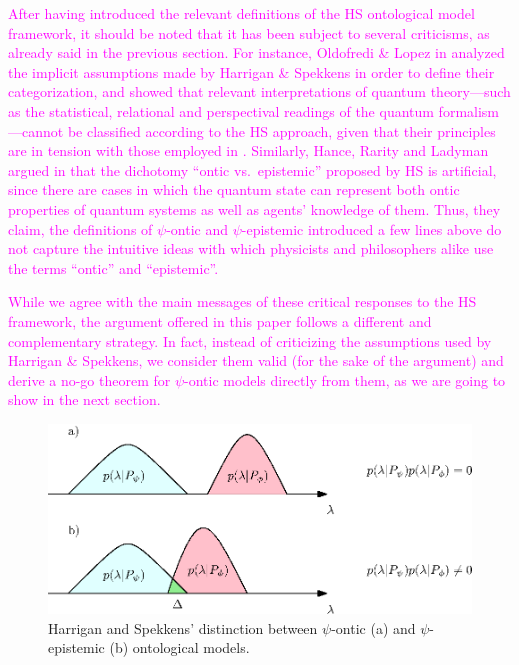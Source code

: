 \documentclass[10pt,twocolumn, nofootinbib]{revtex4-2}
\begin{document}
\textcolor{magenta}{After having introduced the relevant definitions of the HS ontological model framework, it should be noted that it has been subject to several criticisms, as already said in the previous section. For instance, Oldofredi \& Lopez in \cite{Oldofredi:2020b} analyzed the implicit assumptions made by Harrigan \& Spekkens in order to define their categorization, and showed that relevant interpretations of quantum theory---such as the statistical, relational and perspectival readings of the quantum formalism---cannot be classified according to the HS approach, given that their principles are in tension with those employed in \cite{Harrigan:2010}. Similarly, Hance, Rarity and Ladyman argued in \cite{Ladyman:2021} that the dichotomy ``ontic vs.\ epistemic'' proposed by HS is artificial, since there are cases in which the quantum state can represent both ontic properties of quantum systems as well as agents' knowledge of them. Thus, they claim, the definitions of $\psi$-ontic and $\psi$-epistemic introduced a few lines above do not capture the intuitive ideas with which physicists and philosophers alike use the terms ``ontic'' and ``epistemic''.}

\textcolor{magenta}{While we agree with the main messages of these critical responses to the HS framework, the argument offered in this paper follows a different and complementary strategy. In fact, instead of criticizing the assumptions used by Harrigan \& Spekkens, we consider them valid (for the sake of the argument) and derive a no-go theorem for $\psi$-ontic models directly from them, as we are going to show in the next section.}


\begin{figure}
\includegraphics[scale=.7]{ontic}
\caption{\footnotesize{Harrigan and Spekkens' distinction between $\psi$-ontic (a) and $\psi$-epistemic (b) ontological models.}}\label{overlap}
\end{figure}
\end{document}
